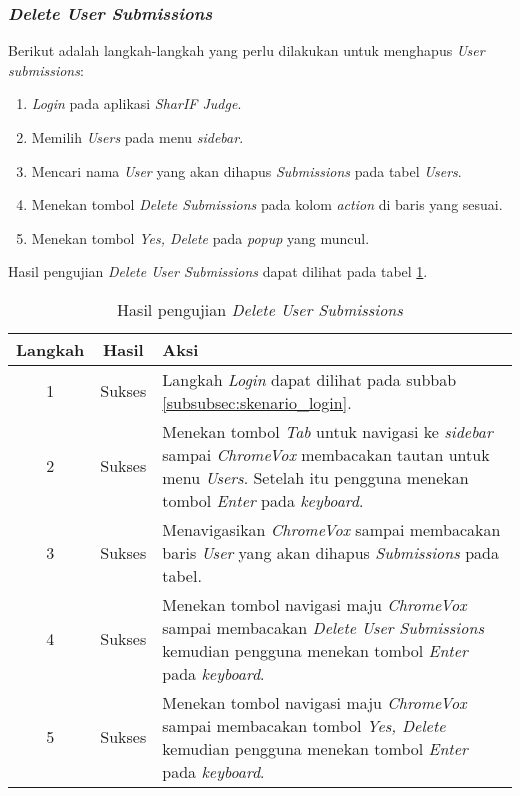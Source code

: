 \subsubsection{\textit{Delete User Submissions}}
\label{subsubsec:skenario_delete_user_submissions}
Berikut adalah langkah-langkah yang perlu dilakukan untuk menghapus \textit{User submissions}:

\begin{enumerate}
	\item \textit{Login} pada aplikasi \textit{SharIF Judge}.
	\item Memilih \textit{Users} pada menu \textit{sidebar}.
	\item Mencari nama \textit{User} yang akan dihapus \textit{Submissions} pada tabel \textit{Users}.
	\item Menekan tombol \textit{Delete Submissions} pada kolom \textit{action} di baris yang sesuai.
	\item Menekan tombol \textit{Yes, Delete} pada \textit{popup} yang muncul.
\end{enumerate}

Hasil pengujian \textit{Delete User Submissions} dapat dilihat pada tabel \ref{tab:hasil_delete_user_submissions}.

\begin{table}[H]
	\centering
	\caption{Hasil pengujian \textit{Delete User Submissions}}
	\label{tab:hasil_delete_user_submissions}
	\begin{tabular}{|c|c|p{12cm}|}
		\toprule
		Langkah & Hasil & Aksi\\
		\midrule
		1 & Sukses & Langkah \textit{Login} dapat dilihat pada subbab \ref{subsubsec:skenario_login}.\\
		2 & Sukses & Menekan tombol \textit{Tab} untuk navigasi ke \textit{sidebar} sampai \textit{ChromeVox} membacakan tautan untuk menu \textit{Users}. Setelah itu pengguna menekan tombol \textit{Enter} pada \textit{keyboard}.\\
		3 & Sukses & Menavigasikan \textit{ChromeVox} sampai membacakan baris \textit{User} yang akan dihapus \textit{Submissions} pada tabel.\\
		4 & Sukses & Menekan tombol navigasi maju \textit{ChromeVox} sampai membacakan \textit{Delete User Submissions} kemudian pengguna menekan tombol \textit{Enter} pada \textit{keyboard}.\\
		5 & Sukses & Menekan tombol navigasi maju \textit{ChromeVox} sampai membacakan tombol \textit{Yes, Delete} kemudian pengguna menekan tombol \textit{Enter} pada \textit{keyboard}.\\
		\bottomrule
	\end{tabular}
\end{table}

